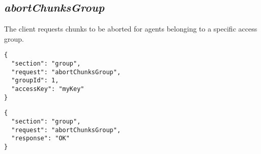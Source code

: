 \subsection*{\textit{abortChunksGroup}}
The client requests chunks to be aborted for agents belonging to a specific access group.
{
	\color{blue}
	\begin{verbatim}
{
  "section": "group",
  "request": "abortChunksGroup",
  "groupId": 1,
  "accessKey": "myKey"
}
	\end{verbatim}
}
{
	\color{OliveGreen}
	\begin{verbatim}
{
  "section": "group",
  "request": "abortChunksGroup",
  "response": "OK"
}
	\end{verbatim}
}









